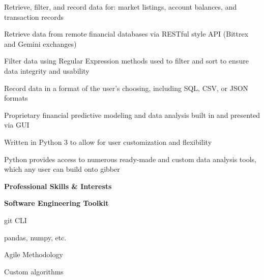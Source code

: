 \documentclass[letterpaper,final]{memoir}
\newcommand{\LargeSep}{\vspace{1.3em}}
\newcommand{\Sep}{\vspace{1.0em}}
\newcommand{\SmallSep}{\vspace{0.4em}}
\newcommand{\CVSection}[1]
	{\LARGE\textbf{#1}\par
	\SmallSep\normalsize}
\newcommand{\CVItem}[1]
	{\textbf{\color{Blue} #1}}
\begin{document}
\begin{compactitem}[\color{Blue}$\circ$]

    \SmallSep
    
    \item Retrieve, filter, and record data for: market listings, account balances, and transaction records
    
    \item Retrieve data from remote financial databases via RESTful style API (Bittrex and Gemini exchanges)
    
    \item Filter data using Regular Expression methods used to filter and sort to ensure data integrity and usability
    
    \item Record data in a format of the user's choosing, including SQL, CSV, or JSON formats
    
    \item Proprietary financial predictive modeling and data analysis built in and presented via GUI
    
    \item Written in Python 3 to allow for user customization and flexibility
    
    \item Python provides access to numerous ready-made and custom data analysis tools, which any user can build onto gibber

\end{compactitem}
\LargeSep


\notoserif \CVSection{Professional Skills \& Interests}
\normalfont

\Sep
\CVItem{Software Engineering Toolkit}
\SmallSep

\begin{multicols}{4}

    \begin{compactitem}[\color{Blue}$\circ$]
		
		\item git CLI
        \SmallSep
        
        \item pandas, numpy, etc.
        \SmallSep
        
        \item Agile Methodology
        \SmallSep
        
        \item Custom algorithms
        
    
	\end{compactitem}

\end{multicols}
\end{document}
